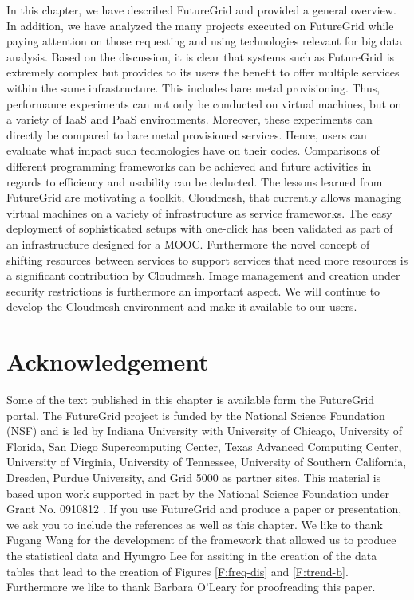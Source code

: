 \documentclass[graybox]{svmult}
\begin{document}
In this chapter, we have described FutureGrid and provided a general overview. In addition, we have analyzed the many projects executed on FutureGrid while paying attention on those requesting and using technologies relevant for big data analysis. Based on the discussion, it is clear that systems such as FutureGrid is extremely complex but provides to its users the benefit to offer multiple services within the same infrastructure. This includes bare metal provisioning. Thus, performance experiments can not only be conducted on virtual machines, but on a variety of IaaS and PaaS environments. Moreover, these experiments can directly be compared to bare metal provisioned services. Hence, users can evaluate what impact such technologies have on their codes. Comparisons of different programming frameworks can be achieved and future activities in regards to efficiency and usability can be deducted. The lessons learned from FutureGrid are motivating a toolkit, Cloudmesh, that currently allows managing virtual machines on a variety of infrastructure as service frameworks. The easy deployment of sophisticated setups with one-click has been validated as part of an infrastructure designed for a MOOC. Furthermore the novel concept of shifting resources \cite{las08federated-cloud} between services to support services that need more resources is a significant contribution by Cloudmesh. Image management and creation under security restrictions \cite{fg-1295} is furthermore an important aspect. We will continue to develop the Cloudmesh environment and make it available to our users.



\section*{Acknowledgement}

Some of the text published in this chapter is available form the FutureGrid portal.  The FutureGrid project is funded by the National Science Foundation (NSF) and is led by Indiana University with University of Chicago, University of Florida, San Diego Supercomputing Center, Texas Advanced Computing Center, University of Virginia, University of Tennessee, University of Southern California, Dresden, Purdue University, and Grid 5000 as partner sites. This material is based upon work supported in part by the National Science Foundation under Grant No. 0910812 \cite{las12fg-bookchapter}. If you use FutureGrid and produce a paper or presentation, we ask you to include the references \cite{las2010gce,las12fg-bookchapter} as well as this chapter.  We like to thank Fugang Wang for the development of the framework that allowed us to produce the statistical data and Hyungro Lee for assiting in the creation of the data tables that lead to the creation of Figures \ref{F:freq-dis} and \ref{F:trend-b}. Furthermore we like to thank Barbara O'Leary for proofreading this paper.






%

\clearpage
\printindex
\end{document}
